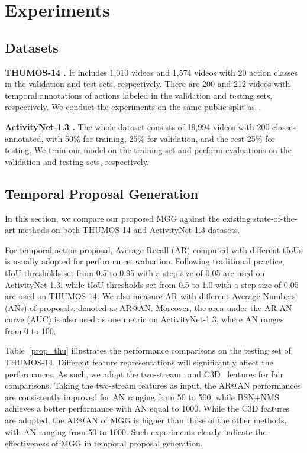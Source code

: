 \documentclass[10pt,twocolumn,letterpaper]{article}
\begin{document}
\section{Experiments}

\subsection{Datasets} 

\textbf{THUMOS-14 \cite{thumos}.} It includes 1,010 videos and 1,574 videos with 20 action classes in the validation and test sets, respectively. There are 200 and 212 videos with temporal annotations of actions labeled in the validation and testing sets, respectively. We conduct the experiments on the same public split as~\cite{TAG,ctap}.


\textbf{ActivityNet-1.3 \cite{activitynet}.} The whole dataset consists of 19,994 videos
with 200 classes annotated, with 50\% for training, 25\% for validation, and the rest 25\% for testing. We train our model on the training set and perform evaluations on the
validation and testing sets, respectively.



\subsection{Temporal Proposal Generation}
In this section, we compare our proposed MGG against the existing state-of-the-art methods on both THUMOS-14 and ActivityNet-1.3 datasets.

For temporal action proposal, Average Recall (AR) computed with different tIoUs is usually adopted for performance evaluation. Following traditional practice, tIoU thresholds set from 0.5 to 0.95 with a step size of 0.05 are used on ActivityNet-1.3, while tIoU thresholds set from 0.5 to 1.0 with a step size of 0.05 are used on THUMOS-14. We also measure AR with different Average Numbers (ANs) of proposals, denoted as AR@AN. Moreover, the area under the AR-AN curve (AUC) is also used as one metric on ActivityNet-1.3, where AN ranges from 0 to 100.




Table~\ref{prop_thu} illustrates the performance comparisons on the testing set of THUMOS-14. Different feature representations will significantly affect the performances. As such, we adopt the two-stream~\cite{2stream} and C3D~\cite{c3d} features for fair comparisons. Taking the two-stream features as input, the AR@AN performances are consistently improved for AN ranging from 50 to 500, while BSN+NMS achieves a better performance with AN equal to 1000. While the C3D features are adopted, the AR@AN of MGG is higher than those of the other methods, with AN ranging from 50 to 1000. Such experiments clearly indicate the effectiveness of MGG in temporal proposal generation. 
\end{document}
